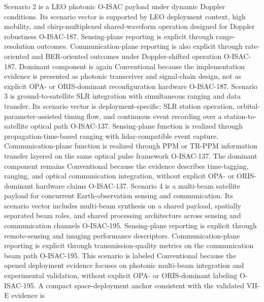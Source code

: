 {}Scenario 2 is a LEO photonic O-ISAC payload under dynamic Doppler conditions. Its scenario vector is supported by LEO deployment context, high mobility, and chirp-multiplexed shared-waveform operation designed for Doppler robustness O-ISAC-187. Sensing-plane reporting is explicit through range-resolution outcomes. Communication-plane reporting is also explicit through rate-oriented and BER-oriented outcomes under Doppler-shifted operation O-ISAC-187. Dominant component is again Conventional because the implementation evidence is presented as photonic transceiver and signal-chain design, not as explicit OPA- or ORIS-dominant reconfiguration hardware O-ISAC-187.\markdownRendererInterblockSeparator
{}
\markdownRendererSectionEnd \markdownRendererSectionBegin
{}\markdownRendererInterblockSeparator
{}Scenario 3 is ground-to-satellite SLR integration with simultaneous ranging and data transfer. Its scenario vector is deployment-specific: SLR station operation, orbital-parameter-assisted timing flow, and continuous event recording over a station-to-satellite optical path O-ISAC-137. Sensing-plane function is realized through propagation-time-based ranging with lidar-compatible event capture. Communication-plane function is realized through PPM or TR-PPM information transfer layered on the same optical pulse framework O-ISAC-137. The dominant component remains Conventional because the evidence describes time-tagging, ranging, and optical communication integration, without explicit OPA- or ORIS-dominant hardware claims O-ISAC-137.\markdownRendererParagraphSeparator
{}Scenario 4 is a multi-beam satellite payload for concurrent Earth-observation sensing and communication. Its scenario vector includes multi-beam synthesis on a shared payload, spatially separated beam roles, and shared processing architecture across sensing and communication channels O-ISAC-195. Sensing-plane reporting is explicit through remote-sensing and imaging performance descriptors. Communication-plane reporting is explicit through transmission-quality metrics on the communication beam path O-ISAC-195. This scenario is labeled Conventional because the opened deployment evidence focuses on photonic multi-beam integration and experimental validation, without explicit OPA- or ORIS-dominant labeling O-ISAC-195.\markdownRendererInterblockSeparator
{}
\markdownRendererSectionEnd \markdownRendererSectionBegin
{}\markdownRendererInterblockSeparator
{}A compact space-deployment anchor consistent with the validated VII-E evidence is\markdownRendererParagraphSeparator
